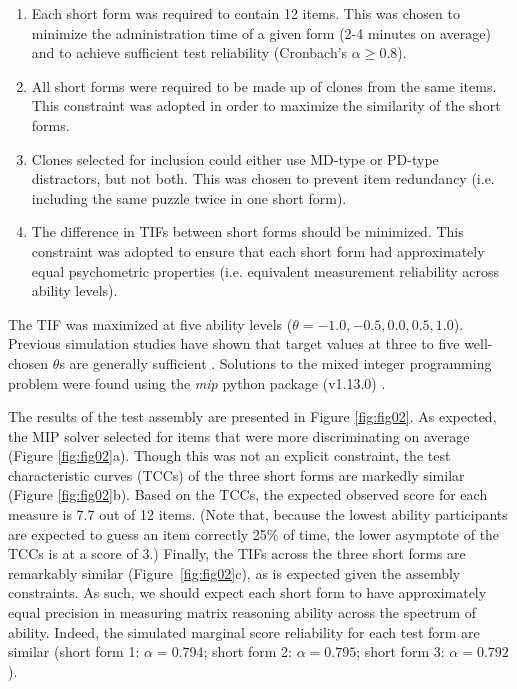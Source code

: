 \documentclass[a4paper,man,natbib]{apa6}
\begin{document}
\begin{enumerate}

    \item Each short form was required to contain 12 items. This was chosen to minimize the administration time of a given form (2-4 minutes on average) and to achieve sufficient test reliability (Cronbach's $\alpha \geq 0.8$).
    
    \item All short forms were required to be made up of clones from the same items. This constraint was adopted in order to maximize the similarity of the short forms.
    
    \item Clones selected for inclusion could either use MD-type or PD-type distractors, but not both. This was chosen to prevent item redundancy (i.e. including the same puzzle twice in one short form).
    
    \item The difference in TIFs between short forms should be minimized. This constraint was adopted to ensure that each short form had approximately equal psychometric properties (i.e. equivalent measurement reliability across ability levels). 
    
\end{enumerate}

\noindent The TIF was maximized at five ability levels ($\theta = -1.0, -0.5, 0.0, 0.5, 1.0$). Previous simulation studies have shown that target values at three to five well-chosen $\theta$s are generally sufficient \citep{der2005wj}. Solutions to the mixed integer programming problem were found using the \textit{mip} python package (v1.13.0) \citep{santos2020mixed}.

The results of the test assembly are presented in Figure \ref{fig:fig02}. As expected, the MIP solver selected for items that were more discriminating on average (Figure \ref{fig:fig02}a). Though this was not an explicit constraint, the test characteristic curves (TCCs) of the three short forms are markedly similar (Figure \ref{fig:fig02}b). Based on the TCCs, the expected observed score for each measure is 7.7 out of 12 items. (Note that, because the lowest ability participants are expected to guess an item correctly 25\% of time, the lower asymptote of the TCCs is at a score of 3.) Finally, the TIFs across the three short forms are remarkably similar (Figure~\ref{fig:fig02}c), as is expected given the assembly constraints. As such, we should expect each short form to have approximately equal precision in measuring matrix reasoning ability across the spectrum of ability. Indeed, the simulated marginal score reliability for each test form are similar (short form 1: $\alpha = 0.794$; short form 2: $\alpha = 0.795$; short form 3: $\alpha = 0.792$). 
\end{document}
